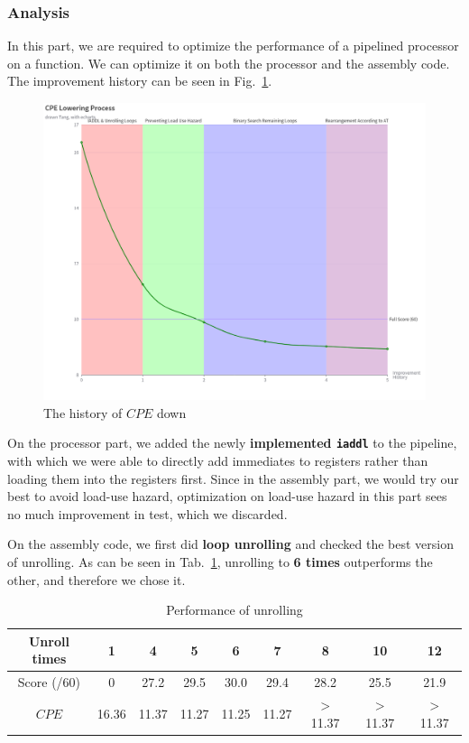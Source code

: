 \documentclass{article}
\begin{document}
\subsubsection{Analysis}
\hspace{1 em}
\par In this part, we are required to optimize the performance of a pipelined processor on a function. We can optimize it on both the processor and the assembly code. The improvement history can be seen in Fig.~\ref{fig:cpe_down_hist}.
\begin{figure}[h]
    \centering
    \includegraphics[width=1.0\textwidth]{CPE Lowering Process.png}
    \caption{The history of $CPE$ down}
    \label{fig:cpe_down_hist}
\end{figure}
\par On the processor part, we added the newly \textbf{implemented \lstinline{iaddl}} to the pipeline, with which we were able to directly add immediates to registers rather than loading them into the registers first. Since in the assembly part, we would try our best to avoid load-use hazard, optimization on load-use hazard in this part sees no much improvement in test, which we discarded.
\par On the assembly code, we first did \textbf{loop unrolling} and checked the best version of unrolling. As can be seen in Tab.~\ref{tab:unroll_res}, unrolling to \textbf{6 times} outperforms the other, and therefore we chose it.
\begin{table}[h]
    \centering
    \begin{tabular}{c|cccccccc}
         Unroll times & 1 & 4 & 5 & 6 & 7 & 8 & 10 & 12 \\
         \hline
        Score (/60)& 0 & 27.2 & 29.5 & 30.0 & 29.4 & 28.2 & 25.5 & 21.9 \\
        $CPE$ & 16.36 & 11.37 & 11.27 & 11.25 & 11.27 & $>$11.37 & $>$11.37 & $>$11.37
    \end{tabular}
    \caption{Performance of unrolling}
    \label{tab:unroll_res}
\end{table}
\end{document}
